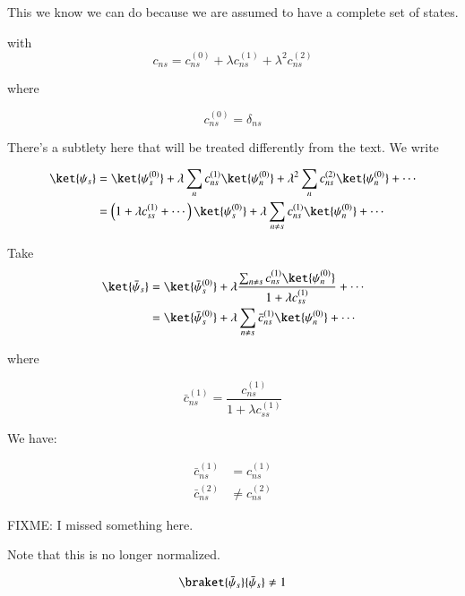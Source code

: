 This we know we can do because we are assumed to have a complete set of states.

with
\begin{equation}\label{eqn:qmTwoL3:490}
c_{ns} = c_{ns}^{(0)}  + \lambda c_{ns}^{(1)} + \lambda^2 c_{ns}^{(2)}
\end{equation}

where

\begin{equation}\label{eqn:qmTwoL3:510}
c_{ns}^{(0)} = \delta_{ns}
\end{equation}

There's a subtlety here that will be treated differently from the text.  We write

\begin{align*}
\ket{\psi_s}
&=
\ket{\psi_s^{(0)}}
+ 
\lambda 
\sum_n
c_{ns}^{(1)} 
\ket{\psi_n^{(0)}}
+ 
\lambda^2
\sum_n
c_{ns}^{(2)}
\ket{\psi_n^{(0)}}
+ \cdots \\
&=
\left(
1 + \lambda c_{ss}^{(1)} + \cdots
\right)
\ket{\psi_s^{(0)}}
+ \lambda 
\sum_{n \ne s} c_{ns}^{(1)} 
\ket{\psi_n^{(0)}}
+ \cdots
\end{align*}

Take
\begin{align*}
\ket{\bar{\psi}_s}
&=
\ket{\bar{\psi}_s^{(0)}}
+ 
\lambda
\frac{
\sum_{n \ne s} c_{ns}^{(1)} 
\ket{\psi_n^{(0)}}
}
{
1 + \lambda c_{ss}^{(1)}
} 
+ \cdots
\\
&=
\ket{\bar{\psi}_s^{(0)}}
+ 
\lambda
\sum_{n \ne s} \bar{c}_{ns}^{(1)} 
\ket{\psi_n^{(0)}} + \cdots
\end{align*}

where 

\begin{equation}\label{eqn:qmTwoL3:n}
\bar{c}_{ns}^{(1)}  =
\frac{c_{ns}^{(1)} }
{
1 + \lambda c_{ss}^{(1)}
} 
\end{equation}

We have: 

\begin{align*}
\bar{c}_{ns}^{(1)} &= c_{ns}^{(1)} \\
\bar{c}_{ns}^{(2)} &\ne c_{ns}^{(2)} 
\end{align*}

FIXME: I missed something here.

Note that this is no longer normalized.

\begin{equation}\label{eqn:qmTwoL3:530}
\braket{\bar{\psi}_s}{\bar{\psi}_s} \ne 1
\end{equation}

\EndArticle
